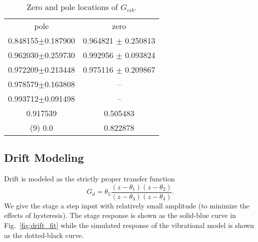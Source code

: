\documentclass[journal,twocolumn,twoside]{IEEEtran}
\begin{document}
\begin{table}
  \centering
  \caption{Zero and pole locations of $G_{vib}$. }
  \label{tab:pzgvib}
  \begin{tabular}{cc}
    pole & zero\\
    0.848155$\pm$0.187900 & 0.964821 $\pm$ 0.250813\\ 
    0.962030$\pm$0.259730 & 0.992956 $\pm$ 0.093824\\ 
    0.972209$\pm$0.213448 & 0.975116 $\pm$ 0.209867\\ 
    0.978579$\pm$0.163808 & --\\ 
    0.993712$\pm$0.091498 & --\\ 
    0.917539 & 0.505483 \\ 
    (9) 0.0 & 0.822878 \\ 
  \end{tabular}
\end{table}


\subsection{Drift Modeling}\label{sec:drift_model}




Drift is modeled as the strictly proper transfer function
\begin{equation}
G_d = \theta_5\frac{(z-\theta_1)(z-\theta_2)}{(z-\theta_3)(z-\theta_4)}.
\end{equation}
We give the stage a step input with relatively small amplitude (to minimize the effects of hysteresis). The stage response is shown as the solid-blue curve in Fig.~\ref{fig:drift_fit} while the simulated response of the vibrational model is shown as the dotted-black curve. 
\end{document}
